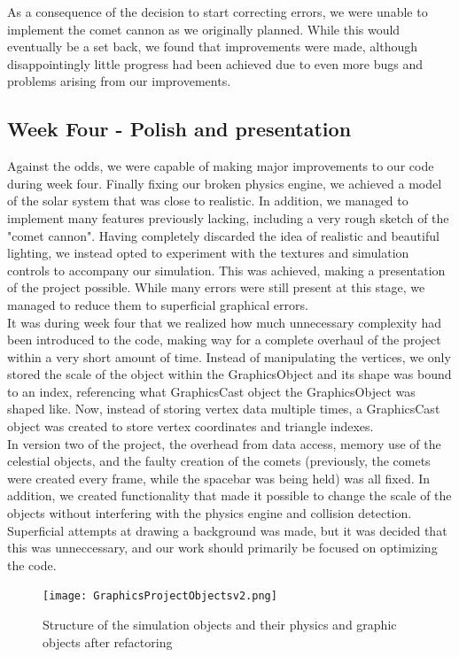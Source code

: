As a consequence of the decision to start correcting errors, we were unable to implement the comet cannon as we originally planned. While this would eventually be a set back, we found that improvements were made, although disappointingly little progress had been achieved due to even more bugs and problems arising from our improvements.

\subsection{Week Four - Polish and presentation}
Against the odds, we were capable of making major improvements to our code during week four. Finally fixing our broken physics engine, we achieved a model of the solar system that was close to realistic. In addition, we managed to implement many features previously lacking, including a very rough sketch of the "comet cannon". Having completely discarded the idea of realistic and beautiful lighting, we instead opted to experiment with the textures and simulation controls to accompany our simulation. This was achieved, making a presentation of the project possible. While many errors were still present at this stage, we managed to reduce them to superficial graphical errors.\\

It was during week four that we realized how much unnecessary complexity had been introduced to the code, making way for a complete overhaul of the project within a very short amount of time. Instead of manipulating the vertices, we only stored the scale of the object within the GraphicsObject and its shape was bound to an index, referencing what GraphicsCast object the GraphicsObject was shaped like. Now, instead of storing vertex data multiple times, a GraphicsCast object was created to store vertex coordinates and triangle indexes.\\

In version two of the project, the overhead from data access, memory use of the celestial objects, and the faulty creation of the comets (previously, the comets were created every frame, while the spacebar was being held) was all fixed. In addition, we created functionality that made it possible to change the scale of the objects without interfering with the physics engine and collision detection. Superficial attempts at drawing a background was made, but it was decided that this was unneccessary, and our work should primarily be focused on optimizing the code.


\begin{figure}[h]
\centering
\texttt{[image: GraphicsProjectObjectsv2.png]}
\label{GraphicsObjectsv2}
\caption{Structure of the simulation objects and their physics and graphic objects after refactoring}
\end{figure}
